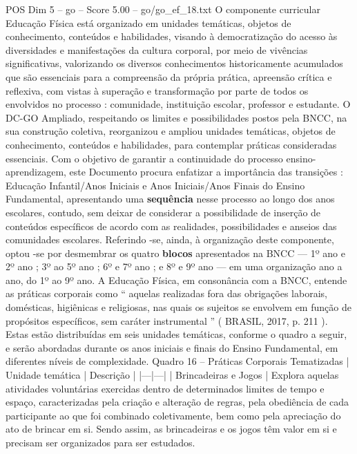 \begin{textsample}{POS Dim 5 – go – Score 5.00 – go/go\_ef\_18.txt}  \label{ex:f5_pos_017}
O componente curricular Educação Física está organizado em unidades temáticas, objetos de conhecimento, conteúdos e habilidades, visando à democratização do acesso às diversidades e manifestações da cultura corporal, por meio de vivências significativas, valorizando os diversos conhecimentos historicamente acumulados que são essenciais para a compreensão da própria prática, apreensão crítica e reflexiva, com vistas à superação e transformação por parte de todos os envolvidos no processo : comunidade, instituição escolar, professor e estudante.
O DC-GO Ampliado, respeitando os limites e possibilidades postos pela BNCC, na sua construção coletiva, reorganizou e ampliou unidades temáticas, objetos de conhecimento, conteúdos e habilidades, para contemplar práticas consideradas essenciais.
Com o objetivo de garantir a continuidade do processo ensino-aprendizagem, este Documento procura enfatizar a importância das transições : Educação Infantil/Anos Iniciais e Anos Iniciais/Anos Finais do Ensino Fundamental, apresentando uma \textbf{sequência} nesse processo ao longo dos anos escolares, contudo, sem deixar de considerar a possibilidade de inserção de conteúdos específicos de acordo com as realidades, possibilidades e anseios das comunidades escolares.
Referindo -se, ainda, à organização deste componente, optou -se por desmembrar os quatro \textbf{blocos} apresentados na BNCC — 1º ano e 2º ano ; 3º ao 5º ano ; 6º e 7º ano ; e 8º e 9º ano — em uma organização ano a ano, do 1º ao 9º ano.
A Educação Física, em consonância com a BNCC, entende as práticas corporais como “ aquelas realizadas fora das obrigações laborais, domésticas, higiênicas e religiosas, nas quais os sujeitos se envolvem em função de propósitos específicos, sem caráter instrumental ” ( BRASIL, 2017, p. 211 ).
Estas estão distribuídas em seis unidades temáticas, conforme o quadro a seguir, e serão abordadas durante os anos iniciais e finais do Ensino Fundamental, em diferentes níveis de complexidade.
Quadro 16 – Práticas Corporais Tematizadas | Unidade temática | Descrição | |---|---| | Brincadeiras e Jogos | Explora aquelas atividades voluntárias exercidas dentro de determinados limites de tempo e espaço, caracterizadas pela criação e alteração de regras, pela obediência de cada participante ao que foi combinado coletivamente, bem como pela apreciação do ato de brincar em si.
Sendo assim, as brincadeiras e os jogos têm valor em si e precisam ser organizados para ser estudados.

\end{textsample}

